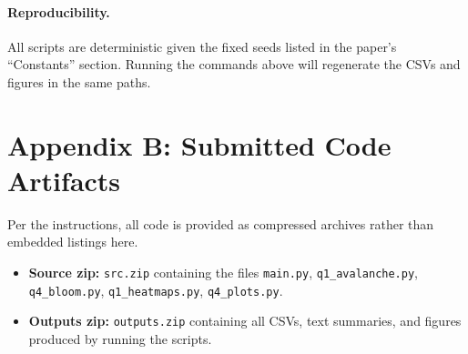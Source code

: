 \documentclass[11pt]{article}
\begin{document}
\paragraph{Reproducibility.}
All scripts are deterministic given the fixed seeds listed in the paper’s “Constants” section.
Running the commands above will regenerate the CSVs and figures in the same paths.


\section*{Appendix B: Submitted Code Artifacts}
Per the instructions, all code is provided as compressed archives rather than embedded listings here.

\begin{itemize}
  \item \textbf{Source zip:} \texttt{src.zip} containing the files \texttt{main.py}, \texttt{q1\_avalanche.py}, \texttt{q4\_bloom.py}, \texttt{q1\_heatmaps.py}, \texttt{q4\_plots.py}.
  \item \textbf{Outputs zip:} \texttt{outputs.zip} containing all CSVs, text summaries, and figures produced by running the scripts.
\end{itemize}
\end{document}

